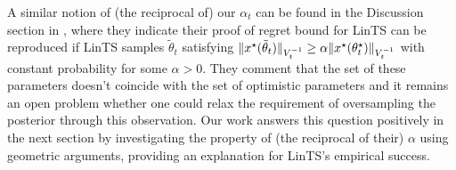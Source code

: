 \begin{remark}
	A similar notion of (the reciprocal of) our $\alpha_t$ can be found in the Discussion section in \citet{abeille2017linear}, where they indicate their proof of regret bound for LinTS can be reproduced if LinTS samples $\tilde{\theta}_t$  satisfying $\|x^\star(\tilde{\theta}_t)\|_{V_t^{-1}} \geq \alpha \|x^\star(\theta^\star_t)\|_{V_t^{-1}} $ with constant probability for some $\alpha>0$. They comment that the set of these parameters doesn't coincide with the set of optimistic parameters and it remains an open problem whether one could relax the requirement of oversampling the posterior through this observation. Our work answers this question positively in the next section by investigating the property of (the reciprocal of their)  $\alpha$ using geometric arguments, providing 
an explanation for LinTS's empirical success.	
\end{remark}








 



